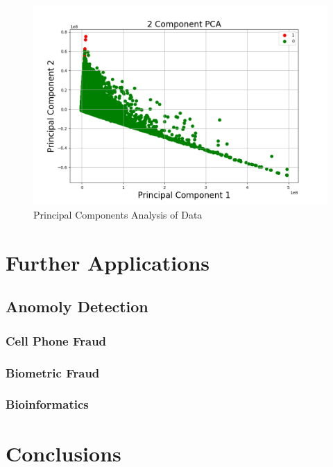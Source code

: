 \documentclass[midd]{thesis}
\begin{document}
\begin{figure} \centering
  \includegraphics[scale=.6]{pca1.png}
  \caption{Principal Components Analysis of Data}
  \label{fig:data1}
\end{figure}




\pagebreak
\chapter{Further Applications}
\label{sec:future}


\section{Anomoly Detection}

\subsection{Cell Phone Fraud}

\subsection{Biometric Fraud}

\subsection{Bioinformatics}

\pagebreak
\chapter{Conclusions}
\label{sec:conclusion}




\end{document}
